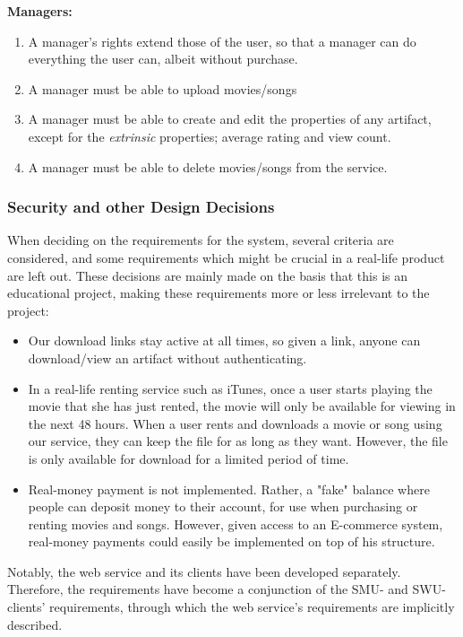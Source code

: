 \textbf{Managers:}
\begin{enumerate}
\setcounter{enumi}{\theenumTemp}
\item A manager's rights extend those of the user, so that a manager can do
	everything the user can, albeit without purchase.
\item A manager must be able to upload movies/songs
\item A manager must be able to create and edit the properties of any artifact,
	except for the \emph{extrinsic} properties; average rating and view
	count.
\item A manager must be able to delete movies/songs from the service.
\end{enumerate}

\subsubsection{Security and other Design Decisions}

When deciding on the
requirements for the system, several criteria are considered, and some
requirements which might be crucial in a real-life product are left out. These
decisions are mainly made on the basis that this is an educational project,
making these requirements more or less irrelevant to the project:
\begin{itemize}
\item Our download links stay active at all times, so given a link, 
	anyone can download/view an artifact without authenticating.
\item In a real-life renting service such as iTunes, once a user starts playing
	the movie that she has just rented, the movie will only be available
	for viewing in the next 48 hours. When a user rents and downloads a
	movie or song using our service, they can keep the file for as long as
	they want. However, the file is only available for download for a
	limited period of time.
\item Real-money payment is not implemented. Rather, a "fake" balance where
	people can deposit money to their account, for use when purchasing or
	renting movies and songs. However, given access to an E-commerce
	system, real-money payments could easily be implemented on top of his
	structure.
\end{itemize}

Notably, the web service and its clients have been developed separately.
Therefore, the requirements have become a conjunction of the SMU- and
SWU-clients' requirements, through which the web service's requirements are
implicitly described.

